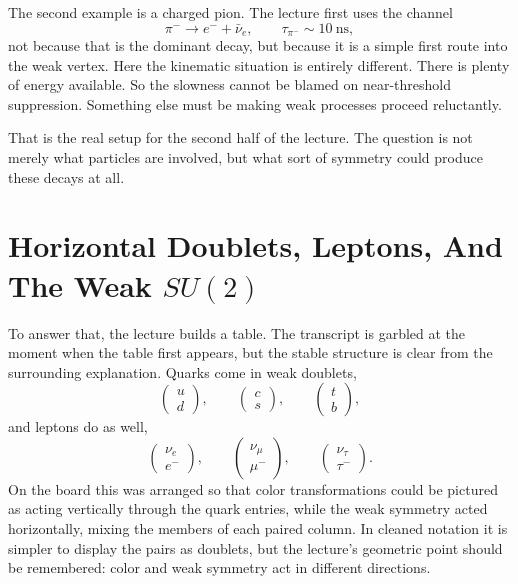 The second example is a charged pion. The lecture first uses the channel
\begin{equation}
\pi^- \to e^-+\bar\nu_e,
\qquad
\tau_{\pi^-}\sim 10\ \text{ns},
\end{equation}
not because that is the dominant decay, but because it is a simple first route into the weak vertex. Here the kinematic situation is entirely different. There is plenty of energy available. So the slowness cannot be blamed on near-threshold suppression. Something else must be making weak processes proceed reluctantly.

That is the real setup for the second half of the lecture. The question is not merely what particles are involved, but what sort of symmetry could produce these decays at all.

\section{Horizontal Doublets, Leptons, And The Weak \(SU(2)\)}

To answer that, the lecture builds a table. The transcript is garbled at the moment when the table first appears, but the stable structure is clear from the surrounding explanation. Quarks come in weak doublets,
\begin{equation}
\left(\begin{array}{c}u\\ d\end{array}\right),
\qquad
\left(\begin{array}{c}c\\ s\end{array}\right),
\qquad
\left(\begin{array}{c}t\\ b\end{array}\right),
\end{equation}
and leptons do as well,
\begin{equation}
\left(\begin{array}{c}\nu_e\\ e^-\end{array}\right),
\qquad
\left(\begin{array}{c}\nu_\mu\\ \mu^-\end{array}\right),
\qquad
\left(\begin{array}{c}\nu_\tau\\ \tau^-\end{array}\right).
\end{equation}
On the board this was arranged so that color transformations could be pictured as acting vertically through the quark entries, while the weak symmetry acted horizontally, mixing the members of each paired column. In cleaned notation it is simpler to display the pairs as doublets, but the lecture's geometric point should be remembered: color and weak symmetry act in different directions.

